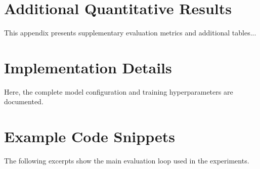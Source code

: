 \chapter{Additional Quantitative Results}
\label{appendix:quantitative}
This appendix presents supplementary evaluation metrics and additional tables...

\chapter{Implementation Details}
\label{appendix:implementation}
Here, the complete model configuration and training hyperparameters are documented.

\chapter{Example Code Snippets}
\label{appendix:code}
The following excerpts show the main evaluation loop used in the experiments.
